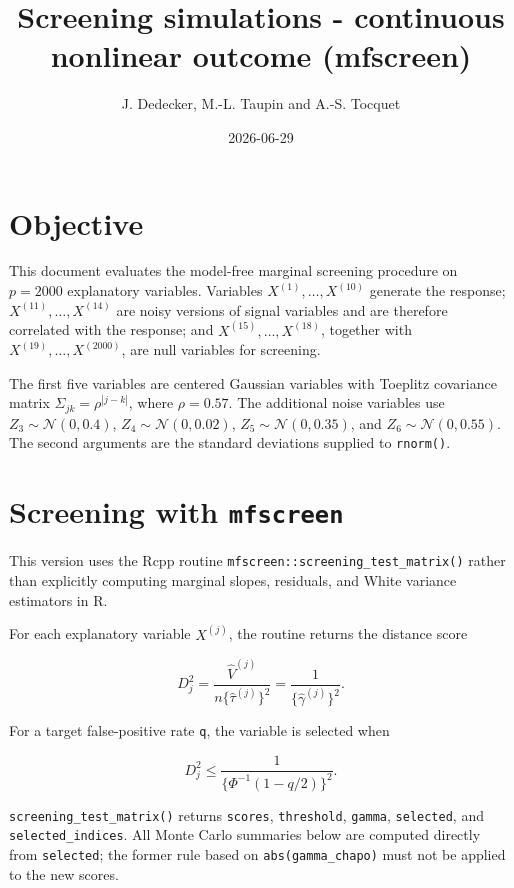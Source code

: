 \documentclass[
]{article}
\title{Screening simulations - continuous nonlinear outcome (mfscreen)}
\author{J. Dedecker, M.-L. Taupin and A.-S. Tocquet}
\date{2026-06-29}
\begin{document}
\maketitle

{
\setcounter{tocdepth}{2}
\tableofcontents
}
\section{Objective}\label{objective}

This document evaluates the model-free marginal screening procedure on
\(p=2000\) explanatory variables. Variables \(X^{(1)},\ldots,X^{(10)}\)
generate the response; \(X^{(11)},\ldots,X^{(14)}\) are noisy versions
of signal variables and are therefore correlated with the response; and
\(X^{(15)},\ldots,X^{(18)}\), together with
\(X^{(19)},\ldots,X^{(2000)}\), are null variables for screening.

The first five variables are centered Gaussian variables with Toeplitz
covariance matrix \(\Sigma_{jk}=\rho^{|j-k|}\), where \(\rho=0.57\). The
additional noise variables use \(Z_3\sim\mathcal{N}(0,0.4)\),
\(Z_4\sim\mathcal{N}(0,0.02)\), \(Z_5\sim\mathcal{N}(0,0.35)\), and
\(Z_6\sim\mathcal{N}(0,0.55)\). The second arguments are the standard
deviations supplied to \texttt{rnorm()}.

\section{\texorpdfstring{Screening with
\texttt{mfscreen}}{Screening with mfscreen}}\label{screening-with-mfscreen}

This version uses the Rcpp routine
\texttt{mfscreen::screening\_test\_matrix()} rather than explicitly
computing marginal slopes, residuals, and White variance estimators in
R.

For each explanatory variable \(X^{(j)}\), the routine returns the
distance score

\[
D_j^2 = \frac{\widehat V^{(j)}}{n\{\widehat\tau^{(j)}\}^2}
      = \frac{1}{\{\widehat\gamma^{(j)}\}^2}.
\]

For a target false-positive rate \texttt{q}, the variable is selected
when

\[
D_j^2 \leq \frac{1}{\{\Phi^{-1}(1-q/2)\}^2}.
\]

\texttt{screening\_test\_matrix()} returns \texttt{scores},
\texttt{threshold}, \texttt{gamma}, \texttt{selected}, and
\texttt{selected\_indices}. All Monte Carlo summaries below are computed
directly from \texttt{selected}; the former rule based on
\texttt{abs(gamma\_chapo)} must not be applied to the new scores.
\end{document}

